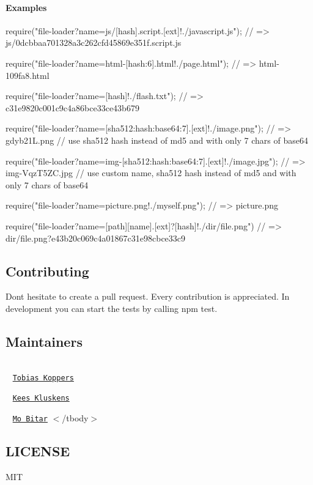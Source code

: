 \paragraph*{Examples}


\begin{DoxyCode}
require("file-loader?name=js/[hash].script.[ext]!./javascript.js");
// => js/0dcbbaa701328a3c262cfd45869e351f.script.js

require("file-loader?name=html-[hash:6].html!./page.html");
// => html-109fa8.html

require("file-loader?name=[hash]!./flash.txt");
// => c31e9820c001c9c4a86bce33ce43b679

require("file-loader?name=[sha512:hash:base64:7].[ext]!./image.png");
// => gdyb21L.png
// use sha512 hash instead of md5 and with only 7 chars of base64

require("file-loader?name=img-[sha512:hash:base64:7].[ext]!./image.jpg");
// => img-VqzT5ZC.jpg
// use custom name, sha512 hash instead of md5 and with only 7 chars of base64

require("file-loader?name=picture.png!./myself.png");
// => picture.png

require("file-loader?name=[path][name].[ext]?[hash]!./dir/file.png")
// => dir/file.png?e43b20c069c4a01867c31e98cbce33c9
\end{DoxyCode}


\subsection*{Contributing}

Don\textquotesingle{}t hesitate to create a pull request. Every contribution is appreciated. In development you can start the tests by calling {\ttfamily npm test}.

\subsection*{Maintainers}

\tabulinesep=1mm
\begin{longtabu} spread 0pt [c]{*{0}{|X[-1]}|}
\hline
\end{longtabu}


 ~\newline
 \href{https://github.com/}{\tt Tobias Koppers}  

 ~\newline
 \href{https://github.com/}{\tt Kees Kluskens}  

 ~\newline
 \href{https://github.com/}{\tt Mo Bitar}   $<$/tbody$>$ 

\subsection*{L\+I\+C\+E\+N\+SE}

M\+IT 